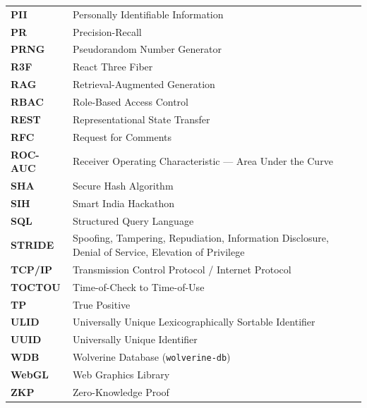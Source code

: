 \begin{tabular}{@{}ll@{}}
\textbf{PII} & Personally Identifiable Information \\
\textbf{PR} & Precision-Recall \\
\textbf{PRNG} & Pseudorandom Number Generator \\
\textbf{R3F} & React Three Fiber \\
\textbf{RAG} & Retrieval-Augmented Generation \\
\textbf{RBAC} & Role-Based Access Control \\
\textbf{REST} & Representational State Transfer \\
\textbf{RFC} & Request for Comments \\
\textbf{ROC-AUC} & Receiver Operating Characteristic --- Area Under the Curve \\
\textbf{SHA} & Secure Hash Algorithm \\
\textbf{SIH} & Smart India Hackathon \\
\textbf{SQL} & Structured Query Language \\
\textbf{STRIDE} & Spoofing, Tampering, Repudiation, Information Disclosure, Denial of Service, Elevation of Privilege \\
\textbf{TCP/IP} & Transmission Control Protocol / Internet Protocol \\
\textbf{TOCTOU} & Time-of-Check to Time-of-Use \\
\textbf{TP} & True Positive \\
\textbf{ULID} & Universally Unique Lexicographically Sortable Identifier \\
\textbf{UUID} & Universally Unique Identifier \\
\textbf{WDB} & Wolverine Database (\texttt{wolverine-db}) \\
\textbf{WebGL} & Web Graphics Library \\
\textbf{ZKP} & Zero-Knowledge Proof \\ \bottomrule
\end{tabular}
